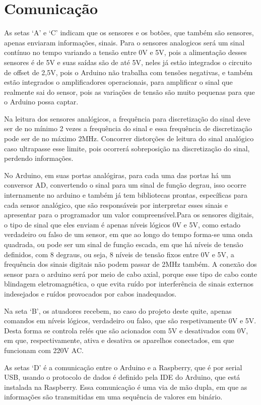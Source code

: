 \section{Comunicação}
\par As setas ‘A’ e ‘C’ indicam que os sensores e os botões, que também são sensores, apenas enviaram informações, sinais. Para o sensores analogicos será um sinal contínuo no tempo variando a tensão entre 0V e 5V, pois a alimentação desses sensores é de 5V e suas saídas são de até 5V, neles já estão integrados o circuito de offset de 2,5V, pois o Arduino não trabalha com tensões negativas, e também estão integrados o amplificadores operacionais, para  amplificar o sinal que realmente sai do sensor, pois as variações de tensão são muito pequenas para que o Arduino possa captar.
\par Na leitura dos sensores analógicos, a frequência para discretização do sinal deve ser de no mínimo 2 vezes a frequência do sinal e essa frequência de discretização pode ser de no máximo 2MHz. Concorrer distorções de leitura do sinal analógico caso ultrapasse esse limite, pois ocorrerá sobreposição na discretização do sinal, perdendo informações.
\par No Arduino, em suas portas analógiras, para cada uma das portas há um conversor AD, convertendo o sinal para um sinal de função degrau, isso ocorre internamente no arduino e também já tem bibliotecas prontas, específicas para cada sensor analógico, que são responsáveis por interpretar esses sinais e apresentar para o programador um valor compreensível.Para os sensores digitais, o  tipo de sinal que eles enviam é apenas  níveis lógicos 0V e 5V, como estado verdadeiro ou falso de um sensor, em que ao longo do tempo forma-se uma onda quadrada, ou pode ser um sinal de função escada, em que há níveis de tensão definidos, com 8 degraus, ou seja, 8 níveis de tensão fixos entre 0V e 5V, a frequência dos sinais digitais não podem passar de 2MHz também. A conexão dos sensor para o arduino será por meio de cabo axial, porque esse tipo de cabo conte blindagem eletromagnética, o que evita ruído por interferência de sinais externos indesejados e ruídos provocados por cabos inadequados.
\par Na seta ‘B’, os atuadores recebem, no caso do projeto deste quite, apenas comandos em níveis lógicos, verdadeiro ou falso, que são respetivamente 0V e 5V. Desta forma se controla relés que são acionados com 5V e desativados com 0V, em que, respectivamente, ativa e desativa os aparelhos conectados, em que funcionam com 220V AC.
\par As setas ‘D’ é a comunicação entre o Arduino e a Raspberry, que é por serial USB, usando o protocolo de dados é definido pela IDE do Arduino, que está instalada na Raspberry. Essa comunicação é uma via de mão dupla, em que as informações são transmitidas em uma sequência de valores em binário.

